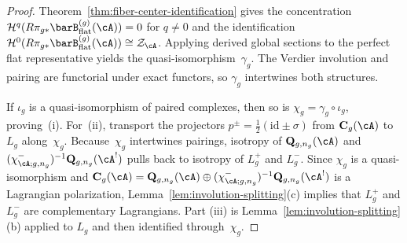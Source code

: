 \begin{proof}
Theorem~\ref{thm:fiber-center-identification} gives
the concentration
$\mathcal{H}^q(R\pi_{g*}\barB^{(g)}_{\mathrm{flat}}(\cA))=0$
for $q \neq 0$ and the identification
$\mathcal{H}^0(R\pi_{g*}\barB^{(g)}_{\mathrm{flat}}(\cA))
\cong \mathcal{Z}_{\cA}$. Applying
derived global sections to the perfect flat representative yields the
quasi-isomorphism~$\gamma_g$. The
Verdier involution and pairing are functorial under exact functors, so
$\gamma_g$ intertwines both structures.

If $\iota_g$ is a quasi-isomorphism of paired complexes, then so is
$\chi_g=\gamma_g\circ\iota_g$, proving~(i). For~(ii), transport the
projectors
$p^\pm=\tfrac{1}{2}(\mathrm{id}\pm\sigma)$ from
$\mathbf{C}_g(\cA)$ to $L_g$ along~$\chi_g$. Because~$\chi_g$
intertwines pairings, isotropy of
$\mathbf{Q}_{g,n_g}(\cA)$ and
$(\chi^-_{\cA;g,n_g})^{-1}\mathbf{Q}_{g,n_g}(\cA^!)$ pulls back to isotropy of
$L_g^+$ and $L_g^-$. Since $\chi_g$ is a quasi-isomorphism and
$\mathbf{C}_g(\cA)=\mathbf{Q}_{g,n_g}(\cA)\oplus
(\chi^-_{\cA;g,n_g})^{-1}\mathbf{Q}_{g,n_g}(\cA^!)$ is a
Lagrangian polarization, Lemma~\ref{lem:involution-splitting}(c)
implies that $L_g^+$ and $L_g^-$ are complementary Lagrangians. Part
(\textup{iii}) is Lemma~\ref{lem:involution-splitting}(b) applied to
$L_g$ and then identified through~$\chi_g$.
\end{proof}

